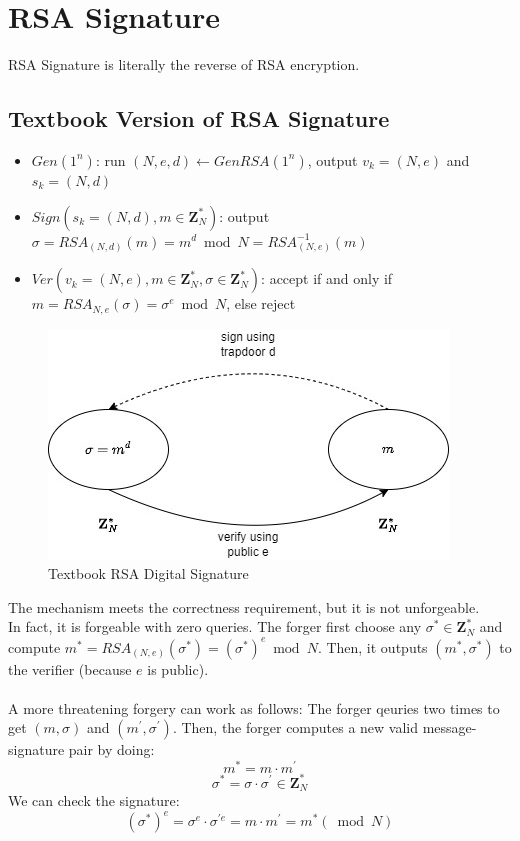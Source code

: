 \documentclass{scribe}
\begin{document}
\section{RSA Signature}
RSA Signature is literally the reverse of RSA encryption.
\subsection{Textbook Version of RSA Signature}
\begin{itemize}
    \item $Gen(1^n)$: run $(N,e,d) \leftarrow GenRSA(1^n)$, output $v_k = (N,e)$ and $s_k = (N,d)$
    \item $Sign(s_k=(N,d), m \in \mathbf{Z}_N^*)$: output $\sigma = RSA_{(N,d)}(m) = m^d \bmod N = RSA_{(N,e)}^{-1}(m)$
    \item $Ver(v_k=(N,e), m \in \mathbf{Z}_N^*, \sigma \in \mathbf{Z}_N^*)$: accept if and only if $m=RSA_{N,e}(\sigma) = \sigma^e \bmod N$, else reject
\end{itemize}
\begin{figure}[H]
    \centering
    \includegraphics[scale=0.5]{rsa_signature.jpg}
    \caption{Textbook RSA Digital Signature}
\end{figure}
The mechanism meets the correctness requirement, but it is not unforgeable. 
\\
In fact, it is forgeable with zero queries. The forger first choose any $\sigma^* \in \mathbf{Z}_N^*$ and compute $m^* = RSA_{(N,e)}(\sigma^*) = (\sigma^*)^e \bmod N$. Then, it outputs $(m^*, \sigma^*)$ to the verifier (because $e$ is public).
\\\\
A more threatening forgery can work as follows:
The forger qeuries two times to get $(m, \sigma)$ and $(m^{'},\sigma^{'})$.
Then, the forger computes a new valid message-signature pair by doing:
\[ m^* = m \cdot m^{'} \]
\[\sigma^{*} = \sigma \cdot \sigma^{'} \in \mathbf{Z}_N^*\]
We can check the signature:
\[(\sigma^{*})^e = \sigma^e \cdot \sigma^{'e} = m \cdot m^{'} = m^{*} (\bmod N)\]
\vspace{5mm}
\end{document}

